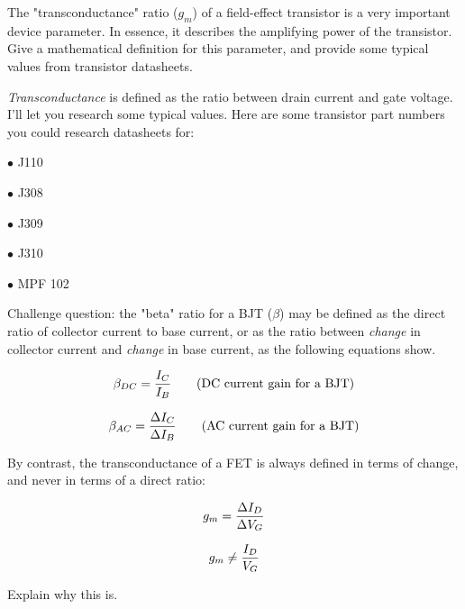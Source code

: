 

The "transconductance" ratio ($g_m$) of a field-effect transistor is a very important device parameter.  In essence, it describes the amplifying power of the transistor.  Give a mathematical definition for this parameter, and provide some typical values from transistor datasheets.







{\it Transconductance} is defined as the ratio between drain current and gate voltage.  I'll let you research some typical values.  Here are some transistor part numbers you could research datasheets for:

\medskip
\goodbreak
\item{$\bullet$} J110
\item{$\bullet$} J308
\item{$\bullet$} J309
\item{$\bullet$} J310
\item{$\bullet$} MPF 102 
\medskip

\vskip 10pt

Challenge question: the "beta" ratio for a BJT ($\beta$) may be defined as the direct ratio of collector current to base current, or as the ratio between {\it change} in collector current and {\it change} in base current, as the following equations show.

$$\beta_{DC} = {I_C \over I_B} \hbox{\hskip 20pt (DC current gain for a BJT)}$$

$$\beta_{AC} = {\Delta I_C \over \Delta I_B} \hbox{\hskip 20pt (AC current gain for a BJT)}$$

By contrast, the transconductance of a FET is always defined in terms of change, and never in terms of a direct ratio:

\goodbreak

$$g_m = {\Delta I_D \over \Delta V_G}$$

$$g_m \neq {I_D \over V_G}$$

Explain why this is.






